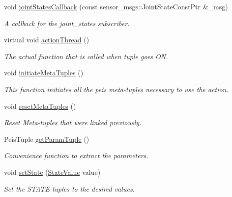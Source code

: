 \begin{DoxyCompactItemize}
\item 
void \hyperlink{classexekutor_1_1MoveHandExekutor_af0c482b7c36a7afac659feaa0eeede92}{joint\-States\-Callback} (const sensor\-\_\-msgs\-::\-Joint\-State\-Const\-Ptr \&\-\_\-msg)
\begin{DoxyCompactList}\small\item\em \-A callback for the joint\-\_\-states subscriber. \end{DoxyCompactList}\item 
virtual void \hyperlink{classexekutor_1_1MoveHandExekutor_ac4a9738dfd031a9b0ee957efefc1e671}{action\-Thread} ()
\begin{DoxyCompactList}\small\item\em \-The actual function that is called when tuple goes \-O\-N. \end{DoxyCompactList}\item 
void \hyperlink{classexekutor_1_1ActionExekutor_ae2f81a4994766a040bf6fa1cf36fbfb5}{initiate\-Meta\-Tuples} ()
\begin{DoxyCompactList}\small\item\em \-This function initiates all the peis meta-\/tuples necessary to use the action. \end{DoxyCompactList}\item 
void \hyperlink{classexekutor_1_1ActionExekutor_a73b5509aeadf1d592b3b2b27bd9ce2ae}{reset\-Meta\-Tuples} ()
\begin{DoxyCompactList}\small\item\em \-Reset \-Meta-\/tuples that were linked previously. \end{DoxyCompactList}\item 
\-Peis\-Tuple \hyperlink{classexekutor_1_1ActionExekutor_ac1e62ad386692ab2cd7e8ae2173f1eb5}{get\-Param\-Tuple} ()
\begin{DoxyCompactList}\small\item\em \-Convenience function to extract the parameters. \end{DoxyCompactList}\item 
void \hyperlink{classexekutor_1_1ActionExekutor_a47056dd4cb829acdbfd6a43378d3f332}{set\-State} (\hyperlink{namespaceexekutor_a82e43e24945d434a81cc5d50282a0e6d}{\-State\-Value} value)
\begin{DoxyCompactList}\small\item\em \-Set the \-S\-T\-A\-T\-E tuples to the desired values. \end{DoxyCompactList}\end{DoxyCompactItemize}
